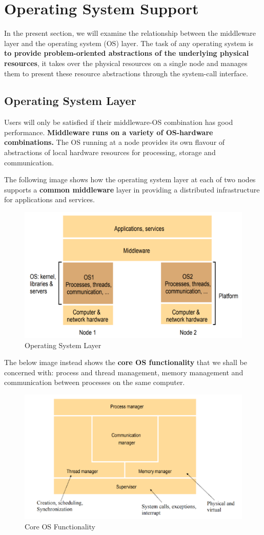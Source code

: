 \chapter{Operating System Support}
In the present section, we will examine the relationship between the middleware layer and the operating system (OS) layer. The task of any operating system is \textbf{to provide problem-oriented abstractions of the underlying physical resources}, it takes over the physical resources on a single node and manages them to present these resource abstractions through the system-call interface.


\section{Operating System Layer}
Users will only be satisfied if their middleware-OS combination has good performance. \textbf{Middleware runs on a variety of OS-hardware combinations.}  The OS running at a node provides its own flavour of abstractions of local hardware resources for processing, storage and communication.

The following image shows how the operating system layer at each of two nodes supports a \textbf{common middleware} layer in providing a distributed infrastructure for applications and services.

\begin{figure}[!h]
    \centering
    \includegraphics[width=.7\linewidth]{images/OperatingSystemSupport/operatingsystemlayer.png}
    \caption{Operating System Layer}
\end{figure}

The below image instead shows the \textbf{core OS functionality} that we shall be concerned with: process and thread management, memory management and communication between processes on the same computer.

\begin{figure}[!h]
    \centering
    \includegraphics[width=.7\linewidth]{images/OperatingSystemSupport/osfunctionality.png}
    \caption{Core OS Functionality}
\end{figure}

